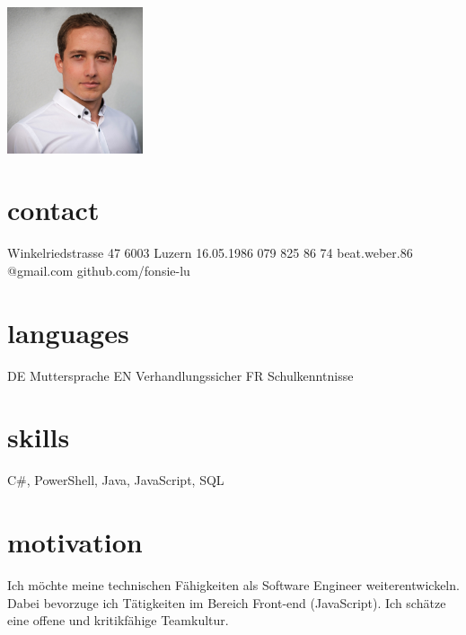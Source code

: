 \documentclass[]{cv-style} %
\begin{document}
\begin{aside}
\section{}
\includegraphics[width=4cm]{portrait}
\section{contact}
Winkelriedstrasse 47
6003 Luzern
\vspace{0.5cm}16.05.1986
\vspace{0.5cm}079 825 86 74
\vspace{0.2cm}beat.weber.86
@gmail.com
\vspace{0.2cm}github.com/fonsie-lu
\section{languages}
DE
Muttersprache
EN
Verhandlungssicher 
FR
Schulkenntnisse
\section{skills}
C\#, PowerShell, Java, JavaScript, SQL
\end{aside}
\section{motivation}
Ich möchte meine technischen Fähigkeiten als Software Engineer weiterentwickeln. Dabei bevorzuge ich Tätigkeiten im Bereich Front-end (JavaScript). Ich schätze eine offene und kritikfähige Teamkultur.
\end{document}
